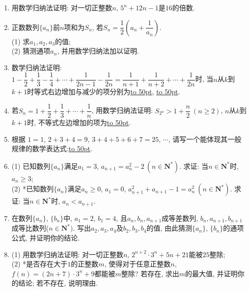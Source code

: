 \documentclass[10pt,a4paper]{article}
\newcommand{\blank}[1]{\underline{\hbox to #1pt{}}}
\begin{document}
\begin{enumerate}[1.]
\item 用数学归纳法证明: 对一切正整数$n$, $5^n+12n-1$是$16$的倍数.
\item 正数数列$\{a_n\}$前$n$项和为$S_n$, 若$S_n=\dfrac 12(a_n+\dfrac 1{a_n})$.\\
(1) 求$a_1,a_2,a_3$的值;\\
(2) 猜测通项$a_n$, 并用数学归纳法加以证明.
\item 数学归纳法证明: $1-\dfrac 12+\dfrac 13-\dfrac 14+\cdots +\dfrac 1{2n-1}-\dfrac 1{2n}=\dfrac 1{n+1}+\dfrac 1{n+2}+\cdots +\dfrac 1{2n}$时, 当$n$从$k$到$k+1$时等式右边增加与减少的项分别为\blank{50}, \blank{50}.
\item 若$S_n=1+\dfrac 12+\dfrac 13+\cdots +\dfrac 1n$, 用数学归纳法证明: $S_{2^n}>1+\dfrac n2\ (n\ge 2)$, $n$从$k$到$k+1$时, 不等式左边增加的项为\blank{50}.
\item 根据 $1=1$, $2+3+4=9$, $3+4+5+6+7=25$, $\cdots$, 请写一个能体现其一般规律的数学表达式:\blank{50}.
\item (1) 已知数列$\{a_n\}$满足$a_1=3$, $a_{n+1}=a_n^2-2\ (n\in \mathbf{N}^*)$. 求证: 当$n\in \mathbf{N}^*$时, $a_n\ge 3$;\\
(2) *已知数列$\{a_n\}$满足$a_n\ge 0$, $a_1=0$, $a_{n+1}^2+a_{n+1}-1=a_n^2 \ (n\in \mathbf{N}^*)$. 求证: 当$n\in \mathbf{N}^*$时, $a_n<a_{n+1}$.
\item 在数列$\{a_n\}$, $\{b_n\}$中, $a_1=2$, $b_1=4$, 且$a_n,b_n,a_{n+1}$成等差数列, $b_n,a_{n+1},b_{n+1}$成等比数列($n\in \mathbf{N}^*)$. 写出$a_2,a_3,a_4$及$b_2,b_3,b_4$的值, 由此猜测$\{a_n\}$, $\{b_n\}$的通项公式, 并证明你的结论.
\item (1) 用数学归纳法证明: 对一切正整数$n$, $2^{n+2}\cdot 3^n+5n+21$能被$25$整除;\\
(2) *是否存在大于$1$的正整数$m$, 使得对于任意正整数$n$, $f(n)=(2n+7)\cdot 3^n+9$都能被$m$整除? 若存在, 求出$m$的最大值, 并证明你的结论; 若不存在, 说明理由.




\end{enumerate}
\end{document}
